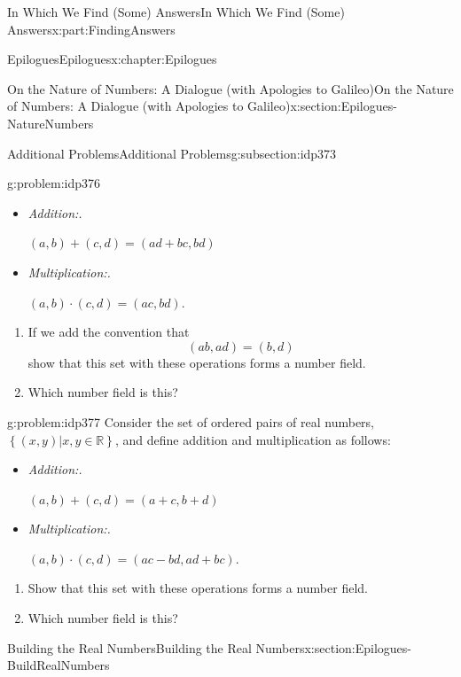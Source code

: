 \documentclass[oneside,10pt,]{book}
\newcommand{\lititle}[1]{{\slshape#1}}
\numberwithin{equation}{section}
\newcommand{\RR}{\mathbb {R}}
\begin{document}
\begin{partptx}{In Which We Find (Some) Answers}{}{In Which We Find (Some) Answers}{}{}{x:part:FindingAnswers}
\begin{chapterptx}{Epilogues}{}{Epilogues}{}{}{x:chapter:Epilogues}
\begin{sectionptx}{On the Nature of Numbers: A Dialogue (with Apologies to Galileo)}{}{On the Nature of Numbers: A Dialogue (with Apologies to Galileo)}{}{}{x:section:Epilogues-NatureNumbers}
\begin{subsectionptx}{Additional Problems}{}{Additional Problems}{}{}{g:subsection:idp373}
\begin{problem}{}{g:problem:idp376}
\par
%
\begin{itemize}[label=\textbullet]
\item{}\lititle{Addition:.}\par%
\(\displaystyle (a,b)+(c,d) = (ad+bc, bd)\)%
\item{}\lititle{Multiplication:.}\par%
\((a,b)\cdot(c,d) = (ac, bd)\).%
\end{itemize}
%
\begin{enumerate}[font=\bfseries,label=(\alph*),ref=\alph*]
\item{}If we add the convention that%
\begin{equation*}
(ab, ad) = (b,d)
\end{equation*}
show that this set with these operations forms a number field.%
\item{}Which number field is this?%
\end{enumerate}
\end{problem}
\begin{problem}{}{g:problem:idp377}%
Consider the set of ordered pairs of real numbers, \(\left\{(x,y)|x, y\in\RR\right\}\), and define addition and multiplication as follows:%
\par
%
\begin{itemize}[label=\textbullet]
\item{}\lititle{Addition:.}\par%
\(\displaystyle (a,b)+(c,d) = (a+c, b+d)\)%
\item{}\lititle{Multiplication:.}\par%
\((a,b)\cdot(c,d) = (ac- bd,ad+bc)\).%
\end{itemize}
%
\begin{enumerate}[font=\bfseries,label=(\alph*),ref=\alph*]
\item{}Show that this set with these operations forms a number field.%
\item{}Which number field is this?%
\end{enumerate}
\end{problem}
\end{subsectionptx}
\end{sectionptx}
%
%
\typeout{************************************************}
\typeout{************************************************}
%
\begin{sectionptx}{Building the Real Numbers}{}{Building the Real Numbers}{}{}{x:section:Epilogues-BuildRealNumbers}

\end{sectionptx}
\end{chapterptx}
\end{partptx}
\end{document}

